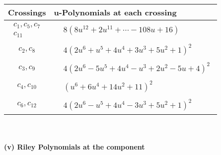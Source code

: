 \documentclass[1p]{elsarticle_modified}
\theoremstyle{definition}
\begin{document}
\begin{tabular}{m{50pt}|m{274pt}}
Crossings & \hspace{64pt}u-Polynomials at each crossing \\
\hline $$\begin{aligned}c_{1},c_{5},c_{7}\\c_{11}\end{aligned}$$&$\begin{aligned}
&8(8 u^{12}+2 u^{11}+\cdots-108 u+16)
\end{aligned}$\\
\hline $$\begin{aligned}c_{2},c_{8}\end{aligned}$$&$\begin{aligned}
&4(2 u^6+u^5+4 u^4+3 u^3+5 u^2+1)^2
\end{aligned}$\\
\hline $$\begin{aligned}c_{3},c_{9}\end{aligned}$$&$\begin{aligned}
&4(2 u^6-5 u^5+4 u^4- u^3+2 u^2-5 u+4)^2
\end{aligned}$\\
\hline $$\begin{aligned}c_{4},c_{10}\end{aligned}$$&$\begin{aligned}
&(u^6+6 u^4+14 u^2+11)^2
\end{aligned}$\\
\hline $$\begin{aligned}c_{6},c_{12}\end{aligned}$$&$\begin{aligned}
&4(2 u^6- u^5+4 u^4-3 u^3+5 u^2+1)^2
\end{aligned}$\\
\hline
\end{tabular}\\~\\
\newpage\renewcommand{\arraystretch}{1}
\flushleft \textbf{(v) Riley Polynomials at the component}\newline \\
\end{document}
